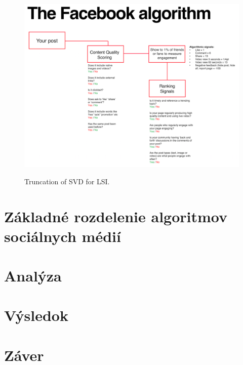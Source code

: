 \documentclass[12pt,twoside,slovak,a4paper]{article}
\begin{document}
\begin{figure}[h]
    \centering
    \includegraphics[scale=0.6]{dd3ba30631ea2b442e37f156fe8b0189.PNG} 
     \cite{kontostathis2006}\caption{Truncation of SVD for LSI.}
    \label{fig:truncation}
\end{figure}

\section{Základné rozdelenie algoritmov sociálnych médií}
\section{Analýza}
\section{Výsledok}
\section{Záver} %





\end{document}

